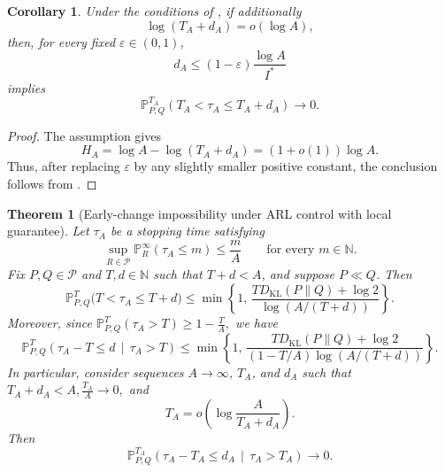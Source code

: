 \documentclass[12pt]{article}
\theoremstyle{spaced}
\newtheorem{theorem}{Theorem}[section]
\newtheorem{corollary}[corollary]{Corollary}
\theoremstyle{remark}
\begin{document}
\begin{corollary}
\label{cor:pointwise-arl-lower}
Under the conditions of , if additionally
\[
    \log(T_A+d_A)=o(\log A),
\]
then, for every fixed \(\varepsilon\in(0,1)\),
\[
    d_A
    \le
    (1-\varepsilon)\frac{\log A}{I^*}
\]
implies
\[
    \mathbb P_{P,Q}^{T_A}
    \left(
        T_A<\tau_A\le T_A+d_A
    \right)
    \longrightarrow0.
\]
\end{corollary}

\begin{proof}
The assumption gives
\[
    H_A
    =
    \log A-\log(T_A+d_A)
    =
    (1+o(1))\log A.
\]
Thus, after replacing \(\varepsilon\) by any slightly smaller positive
constant, the conclusion follows from
.
\end{proof}



\begin{theorem}[Early-change impossibility under ARL control with local guarantee]
\label{thm:early-change-local-arl}
Let $\tau_A$ be a stopping time satisfying
\begin{equation}
\label{eq:local-fa-control}
\sup_{R\in\mathcal P}
\mathbb P_R^\infty(\tau_A\le m)
\le \frac{m}{A}
\qquad
\text{for every }m\in\mathbb N.
\end{equation}
Fix $P,Q\in\mathcal P$ and $T,d\in\mathbb N$ such that
$T+d<A$, and suppose $P\ll Q$. Then
\begin{equation}
\label{eq:early-change-unconditional-bound}
\mathbb P_{P,Q}^{T}
\bigl(T<\tau_A\le T+d\bigr)
\le
\min\left\{
1,\,
\frac{
T D_{\mathrm{KL}}(P\|Q)+\log 2
}{
\log\!\left(A/(T+d)\right)
}
\right\}.
\end{equation}
Moreover, since
$\mathbb P_{P,Q}^{T}(\tau_A>T)
\ge 1-\frac{T}{A},$
we have
\begin{equation}
\label{eq:early-change-conditional-bound}
\mathbb P_{P,Q}^{T}
\left(
\tau_A-T\le d
\,\middle|\,
\tau_A>T
\right)
\le
\min\left\{
1,\,
\frac{
T D_{\mathrm{KL}}(P\|Q)+\log 2
}{
(1-T/A)\log\!\left(A/(T+d)\right)
}
\right\}.
\end{equation}
In particular, consider sequences $A\to\infty$, $T_A$, and $d_A$
such that
$T_A+d_A<A,
\frac{T_A}{A}\to0,$
and
\[
T_A 
=
o\left(
\log\frac{A}{T_A+d_A}
\right).
\]
Then
\[
\mathbb P_{P,Q}^{T_A}
\left(
\tau_A-T_A\le d_A
\,\middle|\,
\tau_A>T_A
\right)
\longrightarrow0.
\]
\end{theorem}
\end{document}
